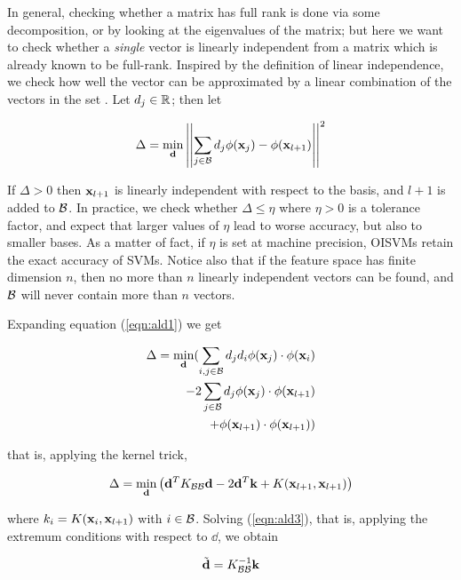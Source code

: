 In general, checking whether a matrix has full rank is done via some
decomposition, or by looking at the eigenvalues of the matrix; but
here we want to check whether a \emph{single} vector is linearly
independent from a matrix which is already known to be
full-rank. Inspired by the definition of linear independence, we check
how well the vector can be approximated by a linear combination of the
vectors in the set \cite{EngelMM02sparse}. Let $d_j \in \mathbb{R}$; then let

\begin{equation} \label{eqn:ald1}
  \Delta = \min_{\mathbf{d}} \left|\left|\sum_{j \in \mathcal{B}} d_j \phi(\mathbf{x}_j) - \phi(\mathbf{x}_{l+1}) \right|\right|^2
\end{equation}

If $\Delta > 0$ then $\mathbf{x}_{l+1}$ is linearly independent with respect
to the basis, and $l+1$ is added to $\mathcal{B}$. In practice, we check
whether $\Delta \leq \eta$ where $\eta > 0$ is a tolerance factor, and
expect that larger values of $\eta$ lead to worse accuracy, but also
to smaller bases. As a matter of fact, if $\eta$ is set at machine
precision, OISVMs retain the exact accuracy of SVMs. Notice also that
if the feature space has finite dimension $n$, then no more than $n$
linearly independent vectors can be found, and $\mathcal{B}$ will never contain
more than $n$ vectors.

Expanding equation (\ref{eqn:ald1}) we get

\begin{eqnarray} \label{eqn:ald2}
  \Delta = \min_{\mathbf{d}} (
      \sum_{i,j \in \mathcal{B}} d_j d_i \phi(\mathbf{x}_j) \cdot \phi(\mathbf{x}_i) \\
    - 2\sum_{j \in \mathcal{B}} d_j \phi(\mathbf{x}_j) \cdot \phi(\mathbf{x}_{l+1}) \nonumber \\
    + \phi(\mathbf{x}_{l+1}) \cdot \phi(\mathbf{x}_{l+1}) ) \nonumber
\end{eqnarray}

\noindent that is, applying the kernel trick,

\begin{equation} \label{eqn:ald3}
  \Delta = \min_{\mathbf{d}} \left(
      \mathbf{d}^T K_{\mathcal{B}\mathcal{B}}\mathbf{d}
    - 2 \mathbf{d}^T \mathbf{k}
    + K(\mathbf{x}_{l+1},\mathbf{x}_{l+1})
  \right)
\end{equation}

\noindent where $k_i = K(\mathbf{x}_i,\mathbf{x}_{l+1})$ with $i \in \mathcal{B}$. Solving
(\ref{eqn:ald3}), that is, applying the extremum conditions with
respect to $\dd$, we obtain

\begin{equation} \label{eqn:ald4}
  \tilde{\mathbf{d}} = K_{\mathcal{B}\mathcal{B}}^{-1} \mathbf{k} \\
\end{equation}

